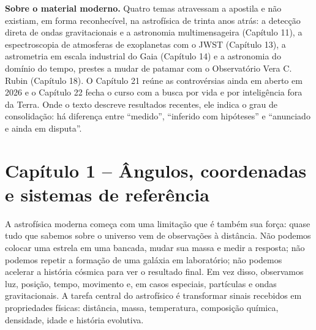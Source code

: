 \documentclass[11pt,a4paper]{article}
\begin{document}
\begin{noticebox}
\textbf{Sobre o material moderno.} Quatro temas atravessam a apostila e não existiam, em forma reconhecível, na astrofísica de trinta anos atrás: a detecção direta de ondas gravitacionais e a astronomia multimensageira (Capítulo 11), a espectroscopia de atmosferas de exoplanetas com o JWST (Capítulo 13), a astrometria em escala industrial do Gaia (Capítulo 14) e a astronomia do domínio do tempo, prestes a mudar de patamar com o Observatório Vera C. Rubin (Capítulo 18). O Capítulo 21 reúne as controvérsias ainda em aberto em 2026 e o Capítulo 22 fecha o curso com a busca por vida e por inteligência fora da Terra. Onde o texto descreve resultados recentes, ele indica o grau de consolidação: há diferença entre ``medido'', ``inferido com hipóteses'' e ``anunciado e ainda em disputa''.
\end{noticebox}


\newpage
\section*{Capítulo 1 -- Ângulos, coordenadas e sistemas de referência}
A astrofísica moderna começa com uma limitação que é também sua força: quase tudo que sabemos sobre o universo vem de observações à distância. Não podemos colocar uma estrela em uma bancada, mudar sua massa e medir a resposta; não podemos repetir a formação de uma galáxia em laboratório; não podemos acelerar a história cósmica para ver o resultado final. Em vez disso, observamos luz, posição, tempo, movimento e, em casos especiais, partículas e ondas gravitacionais. A tarefa central do astrofísico é transformar sinais recebidos em propriedades físicas: distância, massa, temperatura, composição química, densidade, idade e história evolutiva.
\end{document}
